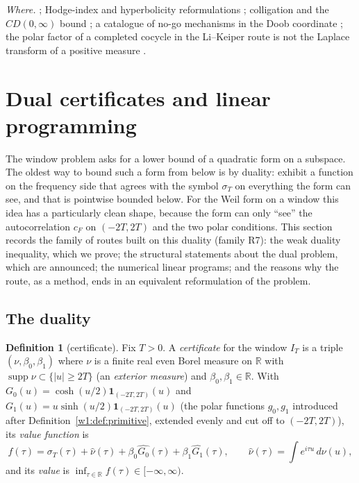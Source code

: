 \documentclass[11pt]{amsart}
\theoremstyle{definition}
\newtheorem{definition}[theorem]{Definition}
\theoremstyle{remark}
\numberwithin{equation}{section}
\newcommand{\R}{\mathbb{R}}
\DeclareMathOperator{\supp}{supp}
\newcommand{\IT}{I_T}                                  %
\newcommand{\cF}{c_F}                                  %
\newcommand{\sT}{\sigma_T}                             %
\newcommand{\entry}[1]{\par\smallskip\noindent\textit{#1.}\enspace}
\begin{document}
\entry{Where} \cite{BrascampLieb1976,Prekopa1973,BakryEmery1985,OsterwalderSchrader1973,BostConnes1995,Schoenberg1951,BeurlingDeny1959,Garding1959};
Hodge-index and hyperbolicity reformulations \cite{P14}; colligation and the $CD(0,\infty)$ bound \cite{P35}; a catalogue of no-go
mechanisms in the Doob coordinate \cite{P41}; the polar factor of a completed cocycle in the Li--Keiper route is not the Laplace transform
of a positive measure \cite[Proposition~3.6]{P37}.


\section{Dual certificates and linear programming}\label{w5:sec:dual}

The window problem asks for a lower bound of a quadratic form on a subspace. The oldest way to bound such a form from
below is by duality: exhibit a function on the frequency side that agrees with the symbol $\sT$ on everything the form can
see, and that is pointwise bounded below. For the Weil form on a window this idea has a particularly clean shape, because
the form can only ``see'' the autocorrelation $\cF$ on $(-2T,2T)$ and the two polar conditions. This section records the
family of routes built on this duality (family R7): the weak duality inequality, which we prove; the structural statements
about the dual problem, which are announced; the numerical linear programs; and the reasons why the route, as a method,
ends in an equivalent reformulation of the problem.

\subsection{The duality}\label{w5:fam:R7}

\begin{definition}[certificate]\label{w5:def:cert}
Fix $T>0$. A \emph{certificate} for the window $\IT$ is a triple $(\nu,\beta_0,\beta_1)$ where $\nu$ is a finite real even
Borel measure on $\R$ with $\supp\nu\subset\{|u|\ge2T\}$ (an \emph{exterior measure}) and $\beta_0,\beta_1\in\R$. With
$G_0(u)=\cosh(u/2)\mathbf 1_{(-2T,2T)}(u)$ and $G_1(u)=u\sinh(u/2)\mathbf 1_{(-2T,2T)}(u)$ (the polar functions $g_0,g_1$ introduced after
Definition~\ref{w1:def:primitive}, extended evenly and cut off to $(-2T,2T)$), its \emph{value function} is
\begin{equation}\label{w5:eq:valuefn}
  f(\tau)=\sT(\tau)+\widehat\nu(\tau)+\beta_0\widehat{G_0}(\tau)+\beta_1\widehat{G_1}(\tau),\qquad
  \widehat\nu(\tau)=\int e^{i\tau u}\,d\nu(u),
\end{equation}
and its \emph{value} is $\inf_{\tau\in\R}f(\tau)\in[-\infty,\infty)$.
\end{definition}
\end{document}
